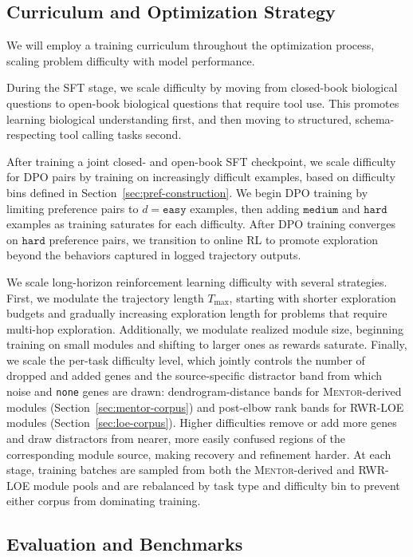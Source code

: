 \documentclass[thesis,letterpaper,12pt]{utthesis}
\begin{document}
\subsection{Curriculum and Optimization Strategy}\label{sec:curriculum}
We will employ a training curriculum throughout the optimization process, scaling problem difficulty with model performance. 

During the SFT stage, we scale difficulty by moving from closed-book biological questions to open-book biological questions that require tool use. This promotes learning biological understanding first, and then moving to structured, schema-respecting tool calling tasks second.

After training a joint closed- and open-book SFT checkpoint, we scale difficulty for DPO pairs by training on increasingly difficult examples, based on difficulty bins defined in Section~\ref{sec:pref-construction}. We begin DPO training by limiting preference pairs to $d = \texttt{easy}$ examples, then adding $\texttt{medium}$ and $\texttt{hard}$ examples as training saturates for each difficulty. After DPO training converges on $\texttt{hard}$ preference pairs, we transition to online RL to promote exploration beyond the behaviors captured in logged trajectory outputs.

We scale long-horizon reinforcement learning difficulty with several strategies. First, we modulate the trajectory length $T_{\max}$, starting with shorter exploration budgets and gradually increasing exploration length for problems that require multi-hop exploration. Additionally, we modulate realized module size, beginning training on small modules and shifting to larger ones as rewards saturate. Finally, we scale the per-task difficulty level, which jointly controls the number of dropped and added genes and the source-specific distractor band from which noise and \texttt{none} genes are drawn: dendrogram-distance bands for \textsc{Mentor}-derived modules (Section~\ref{sec:mentor-corpus}) and post-elbow rank bands for RWR-LOE modules (Section~\ref{sec:loe-corpus}). Higher difficulties remove or add more genes and draw distractors from nearer, more easily confused regions of the corresponding module source, making recovery and refinement harder. At each stage, training batches are sampled from both the \textsc{Mentor}-derived and RWR-LOE module pools and are rebalanced by task type and difficulty bin to prevent either corpus from dominating training.

\subsection{Evaluation and Benchmarks}\label{sec:eval}
\end{document}
